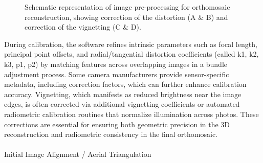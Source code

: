 \documentclass[
  letterpaper,
  11pt,
  english,
  singlespacing,
  headsepline]{MastersDoctoralThesis}
\makeatletter
\let\oldparagraph\paragraph
\renewcommand{\paragraph}{
    \@ifstar
      \xxxParagraphStar
      \xxxParagraphNoStar
  }
\newcommand{\xxxParagraphStar}[1]{\oldparagraph*{#1}\mbox{}}
\newcommand{\xxxParagraphNoStar}[1]{\oldparagraph{#1}\mbox{}}
\makeatother
\begin{document}
\begin{spacing}{1.5}
\begin{figure}


\caption{\label{fig-img_preprocessing}Schematic representation of image
pre-processing for orthomosaic reconstruction, showing correction of the
distortion (A \& B) and correction of the vignetting (C \& D).}

\end{figure}%

During calibration, the software refines intrinsic parameters such as
focal length, principal point offsets, and radial/tangential distortion
coefficients (called k1, k2, k3, p1, p2) by matching features across
overlapping images in a bundle adjustment process. Some camera
manufacturers provide sensor-specific metadata, including correction
factors, which can further enhance calibration accuracy. Vignetting,
which manifests as reduced brightness near the image edges, is often
corrected via additional vignetting coefficients or automated
radiometric calibration routines that normalize illumination across
photos. These corrections are essential for ensuring both geometric
precision in the 3D reconstruction and radiometric consistency in the
final orthomosaic.

\paragraph{Initial Image Alignment / Aerial
Triangulation}\label{initial-image-alignment-aerial-triangulation}


\end{spacing}
\end{document}
